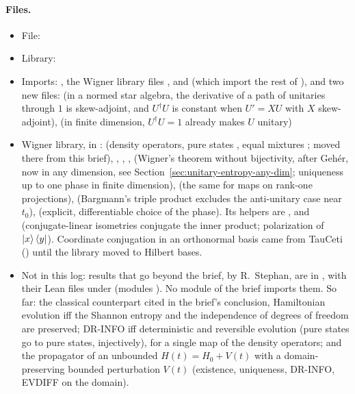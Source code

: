 \documentclass[11pt]{article}
\begin{document}
\paragraph{Files.}\leavevmode
\begin{itemize}
\item File: 
\item Library: 
\item Imports: , the Wigner library files ,
   and  (which import the rest of\newline
  ), and two new  files:\newline
   (in a normed star algebra, the derivative
  of a path of unitaries through $1$ is skew-adjoint, and $U^\dagger U$ is constant when
  $U' = XU$ with $X$ skew-adjoint),\newline
   (in finite dimension,
  $U^\dagger U = 1$ already makes $U$ unitary)
\item Wigner library, in :  (density
  operators, pure states , equal mixtures ; moved there from this brief),
  ,
  , ,  (Wigner's theorem without bijectivity, after
  Geh\'er, now in any dimension, see Section~\ref{sec:unitary-entropy-any-dim}; uniqueness up to
  one phase in finite dimension),  (the same for
  maps on rank-one projections),  (Bargmann's triple product excludes the
  anti-unitary case near $t_0$),  (explicit, differentiable choice of the
  phase). Its  helpers are ,
   and
   (conjugate-linear isometries conjugate the
  inner product; polarization of $\ket{x}\bra{y}$). Coordinate conjugation in an orthonormal
  basis came from TauCeti () until the
  library moved to Hilbert bases.
\item Not in this log: results that go beyond the brief, by R.~Stephan, are in
  , with their Lean files under
   (modules
  ). No module of the brief imports them. So far: the
  classical counterpart cited in the brief's conclusion, Hamiltonian evolution iff the Shannon
  entropy and the independence of degrees of freedom are preserved; DR-INFO iff
  deterministic and reversible evolution (pure states go to pure states, injectively), for a
  single map of the density operators; and the propagator of an unbounded $H(t) = H_0 + V(t)$
  with a domain-preserving bounded perturbation $V(t)$ (existence, uniqueness, DR-INFO, EVDIFF
  on the domain).
\end{itemize}
\end{document}
